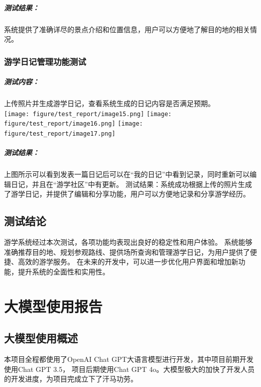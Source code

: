 \documentclass{report}
\begin{document}
\paragraph{测试结果：}
系统提供了准确详尽的景点介绍和位置信息，用户可以方便地了解目的地的相关情况。

\subsection{游学日记管理功能测试}
\paragraph{测试内容：}
上传照片并生成游学日记，查看系统生成的日记内容是否满足预期。\\
\texttt{[image: figure/test\_report/image15.png]}
\texttt{[image: figure/test\_report/image16.png]}
\texttt{[image: figure/test\_report/image17.png]}
\paragraph{测试结果：}
上图所示可以看到发表一篇日记后可以在“我的日记”中看到记录，同时重新可以编辑日记，并且在“游学社区”中有更新。
测试结果：系统成功根据上传的照片生成了游学日记，并提供了编辑和分享功能，用户可以方便地记录和分享游学经历。

\section{测试结论}
游学系统经过本次测试，各项功能均表现出良好的稳定性和用户体验。
系统能够准确推荐目的地、规划参观路线、提供场所查询和管理游学日记，为用户提供了便捷、高效的游学服务。
在未来的开发中，可以进一步优化用户界面和增加新功能，提升系统的全面性和实用性。

\chapter{大模型使用报告}
\section{大模型使用概述}
本项目全程都使用了OpenAI Chat GPT大语言模型进行开发，其中项目前期开发使用Chat GPT 3.5，
项目后期使用Chat GPT 4o。大模型极大的加快了开发人员的开发进度，为项目完成立下了汗马功劳。
\end{document}
